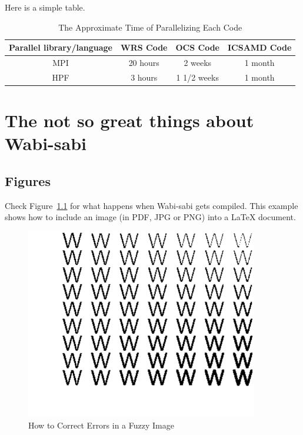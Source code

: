 \documentclass[dissertation]{bsu-cs}  %
\begin{document}
Here is a simple table.

\begin{table}[h] %
\caption{The Approximate Time of Parallelizing Each Code}
\label{table4}
\centering %
\begin{tabular}{|c|c|c|c|}\hline \hline
Parallel library/language  &WRS Code  &OCS Code  &ICSAMD Code\\ \hline
MPI                        &20 hours  &2 weeks   &1 month\\ \hline
HPF                        &3 hours   &1 1/2 weeks  &1 month\\ \hline
\end{tabular}
\end{table}


%
%

\chapter{The not so great things about Wabi-sabi}

\section{Figures}
Check Figure~\ref{fig:fuzzyImage} for what happens when Wabi-sabi gets compiled. This example
shows how to include an image (in PDF, JPG or PNG) into a LaTeX document.

\begin{figure}[h]
\begin{center}
\includegraphics*[width=4.0in,keepaspectratio]{figure}
\end{center}
\caption{How to Correct Errors in a Fuzzy Image}
\label{fig:fuzzyImage}
\end{figure}
\end{document}

